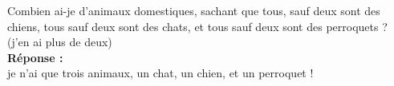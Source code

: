 Combien ai-je d'animaux domestiques, sachant que tous, sauf deux sont des 
chiens, tous sauf deux sont des chats, et tous sauf deux sont des perroquets ? 
(j'en ai plus de deux)\\

\textbf{Réponse :}\\

je n'ai que trois animaux, un chat, un chien, et un perroquet !

